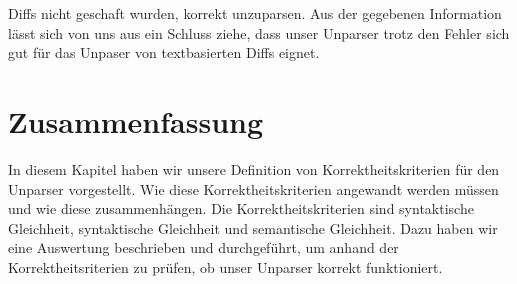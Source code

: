 Diffs nicht geschaft wurden, korrekt unzuparsen. Aus der gegebenen Information lässt sich von uns aus ein Schluss ziehe, dass unser Unparser trotz den Fehler sich gut für das Unpaser von textbasierten Diffs eignet. 

\section{Zusammenfassung}

In diesem Kapitel haben wir unsere Definition von Korrektheitskriterien für den Unparser vorgestellt. Wie diese Korrektheitskriterien angewandt werden müssen und wie diese zusammenhängen. Die Korrektheitskriterien sind syntaktische Gleichheit, syntaktische Gleichheit und semantische Gleichheit. Dazu haben wir eine Auswertung beschrieben und durchgeführt, um anhand der Korrektheitsriterien zu prüfen, ob unser Unparser korrekt funktioniert.








